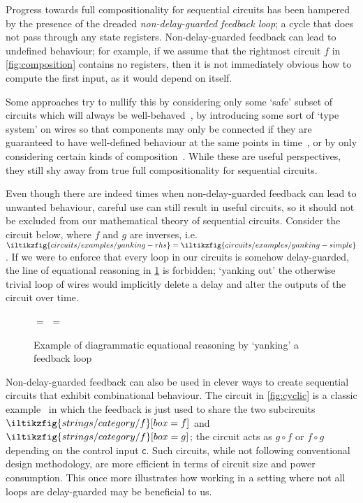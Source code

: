Progress towards full compositionality for sequential circuits has been hampered
by the presence of the dreaded \emph{non-delay-guarded feedback loop};
 a cycle that does not pass through any state
registers.
Non-delay-guarded feedback can lead to undefined behaviour; for example, if we
assume that the rightmost circuit \(f\) in \cref{fig:composition} contains no
registers, then it is not immediately obvious how to compute the first input, as
it would depend on itself.

Some approaches try to nullify this by considering only some `safe' subset of
circuits which will always be well-behaved~\cite{christensen2021wire}, by
introducing some sort of `type system' on wires so that components may only be
connected if they are guaranteed to have well-defined behaviour at the same
points in time~\cite{nigam2023modular}, or by only considering certain kinds of
composition~\cite{alekseyev2014compositional}.
While these are useful perspectives, they still shy away from true full
compositionality for sequential circuits.

Even though there are indeed times when non-delay-guarded feedback can lead to
unwanted behaviour, careful use can still result in useful circuits, so it
should not be excluded from our mathematical theory of sequential circuits.
Consider the circuit below, where \(f\) and \(g\) are inverses, i.e.\
\(
\iltikzfig{circuits/examples/yanking-rhs}
=
\iltikzfig{circuits/examples/yanking-simple}
\).
If we were to enforce that every loop in our circuits is
somehow delay-guarded, the line of equational reasoning in \cref{fig:yanking}
is forbidden; `yanking out' the otherwise trivial loop of wires would implicitly
delete a delay and alter the outputs of the circuit over time.
\begin{figure}
    \centering
    \(=\)
    \(=\)
    \caption{
        Example of diagrammatic equational reasoning by `yanking' a feedback
        loop
    }
    \label{fig:yanking}
\end{figure}

Non-delay-guarded feedback can also be used in clever ways to create sequential
circuits that exhibit combinational behaviour.
The circuit in \cref{fig:cyclic} is a classic example~\cite{malik1994analysis}
in which the feedback is just used to share the two subcircuits \(
\iltikzfig{strings/category/f}[box=f]
\) and \(
\iltikzfig{strings/category/f}[box=g]
\); the circuit acts as \(g \circ f\) or
\(f \circ g\) depending on the control input \(\mathsf{c}\).
Such circuits, while not following conventional design methodology, are more
efficient in terms of circuit size and power consumption.
This once more illustrates how working in a setting where not all loops are
delay-guarded may be beneficial to us.

